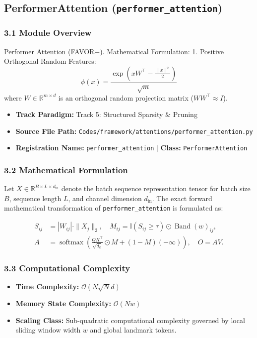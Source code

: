 \subsection{PerformerAttention (\texttt{performer\_attention})}
\label{sec:app_module_performer\_attention}

\subsubsection*{3.1 Module Overview}
Performer Attention (FAVOR+).  Mathematical Formulation:     1. Positive Orthogonal Random Features:        $$\phi(x) = \frac{\exp\left(x W^\top - \frac{\|x\|^2}{2}\right)}{\sqrt{m}}$$        where $W \in \mathbb{R}^{m \times d}$ is an orthogonal random projection matrix ($W W^\top \approx I$).
\begin{itemize}
    \item \textbf{Track Paradigm:} Track 5: Structured Sparsity & Pruning
    \item \textbf{Source File Path:} \texttt{Codes/framework/attentions/performer\_attention.py}
    \item \textbf{Registration Name:} \texttt{performer\_attention} $\mid$ \textbf{Class:} \texttt{PerformerAttention}
\end{itemize}

\subsubsection*{3.2 Mathematical Formulation}
Let $X \in \mathbb{R}^{B \times L \times d_{\text{in}}}$ denote the batch sequence representation tensor for batch size $B$, sequence length $L$, and channel dimension $d_{\text{in}}$. The exact forward mathematical transformation of \texttt{performer\_attention} is formulated as:

\begin{align}
S_{ij} &= |W_{ij}| \cdot \|X_j\|_2, \quad M_{ij} = \mathbb{I}(S_{ij} \ge \tau) \odot \operatorname{Band}(w)_{ij}, \\
A &= \operatorname{softmax}\left(\frac{Q K^\top}{\sqrt{d_k}} \odot M + (1 - M)(-\infty)\right), \quad O = A V.
\end{align}


\subsubsection*{3.3 Computational Complexity}
\begin{itemize}
    \item \textbf{Time Complexity:} $\mathcal{O}(N \sqrt{N} d)$
    \item \textbf{Memory State Complexity:} $\mathcal{O}(N w)$
    \item \textbf{Scaling Class:} Sub-quadratic computational complexity governed by local sliding window width $w$ and global landmark tokens.
\end{itemize}

